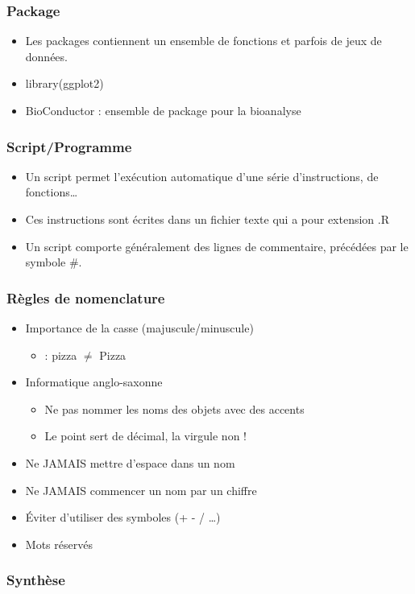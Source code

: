 \documentclass[table,svgnames,hyperref={pdfpagemode=FullScreen}]{beamer}
\newcommand{\grille}{
\begin{tikzpicture}[overlay,remember picture]
	\begin{scope}[shift={(current page.south west)}]
		\draw[gray!50] (0,0) grid[step=2mm] (current page.north east);
		\draw[red!50] (0,0) grid[step=1cm] (current page.north east);
		\draw (0.2,1) node {1};
     \draw (0.2,2) node {2};
     \draw (0.2,3) node {3};
     \draw (0.2,4) node {4};
     \draw (0.2,5) node {5};
     \draw (0.2,6) node {6};
     \draw (0.2,7) node {7};
     \draw (0.2,8) node {8};
     \draw (0.2,9) node {9};
     \draw (1,0.5) node {1};
     \draw (2,0.5) node {2};
     \draw (3,0.5) node {3};
     \draw (4,0.5) node {4};
     \draw (5,0.5) node {5};
     \draw (6,0.5) node {6};
     \draw (7,0.5) node {7};
     \draw (8,0.5) node {8};
     \draw (9,0.5) node {9};
     \draw (10,0.5) node {10};
     \draw (11,0.5) node {11};
     \draw (12,0.5) node {12};
\end{scope}
\end{tikzpicture}
}
\begin{document}
	\begin{frame}
		\frametitle{Package}
		\begin{itemize}
			\item Les packages contiennent un ensemble de fonctions et parfois de jeux de données.
			\item	library(ggplot2)
			\item BioConductor : ensemble de package pour la bioanalyse
		\end{itemize}
	\end{frame}
	\begin{frame}
		\setbeamercovered{dynamic}
		\frametitle{Script/Programme}
		\begin{itemize}
			\item Un script permet l'exécution automatique d'une série d'instructions, de fonctions\dots
			\item Ces instructions sont écrites dans un fichier texte qui a pour extension .R
			\item Un script comporte généralement des lignes de commentaire, précédées par le symbole \#.
		\end{itemize}

		
	\end{frame}
\begin{frame}
	\frametitle{Règles de nomenclature}
	\begin{itemize}
		\item Importance de la casse (majuscule/minuscule)
			\begin{itemize}
				\item : pizza  $\neq$ Pizza
			\end{itemize}
		\item Informatique anglo-saxonne
			\begin{itemize}
				\item Ne pas nommer les noms des objets avec des accents 
				\item Le point sert de décimal, la virgule non !
			\end{itemize}
		\item Ne JAMAIS mettre d'espace dans un nom  
		\item Ne JAMAIS commencer un nom par un chiffre 
		\item Éviter d'utiliser des symboles (+ - / \dots)
		\item Mots réservés
	\end{itemize}
\end{frame}
\begin{frame}
	\frametitle{Synthèse}
	\begin{center}
	
\end{center}
\end{frame}
\end{document}
